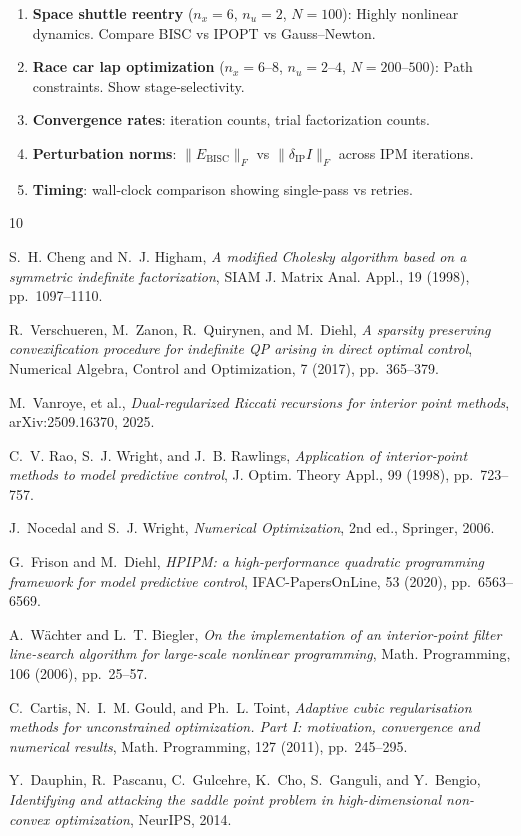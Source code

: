 \documentclass[11pt]{article}
\begin{document}
\begin{enumerate}
  \item \textbf{Space shuttle reentry} ($n_x=6$, $n_u=2$, $N=100$): Highly nonlinear
        dynamics. Compare BISC vs IPOPT vs Gauss--Newton.
  \item \textbf{Race car lap optimization} ($n_x=6\text{--}8$, $n_u=2\text{--}4$, $N=200\text{--}500$):
        Path constraints. Show stage-selectivity.
  \item \textbf{Convergence rates}: iteration counts, trial factorization counts.
  \item \textbf{Perturbation norms}: $\|E_{\mathrm{BISC}}\|_F$ vs
        $\|\delta_{\mathrm{IP}} I\|_F$ across IPM iterations.
  \item \textbf{Timing}: wall-clock comparison showing single-pass vs retries.
\end{enumerate}



\begin{thebibliography}{10}

S.~H. Cheng and N.~J. Higham,
\emph{A modified Cholesky algorithm based on a symmetric indefinite factorization},
SIAM J. Matrix Anal. Appl., 19 (1998), pp.~1097--1110.

R.~Verschueren, M.~Zanon, R.~Quirynen, and M.~Diehl,
\emph{A sparsity preserving convexification procedure for indefinite QP arising in direct optimal control},
Numerical Algebra, Control and Optimization, 7 (2017), pp.~365--379.

M.~Vanroye, et al.,
\emph{Dual-regularized Riccati recursions for interior point methods},
arXiv:2509.16370, 2025.

C.~V. Rao, S.~J. Wright, and J.~B. Rawlings,
\emph{Application of interior-point methods to model predictive control},
J. Optim. Theory Appl., 99 (1998), pp.~723--757.

J.~Nocedal and S.~J. Wright,
\emph{Numerical Optimization}, 2nd ed., Springer, 2006.

G.~Frison and M.~Diehl,
\emph{HPIPM: a high-performance quadratic programming framework for model predictive control},
IFAC-PapersOnLine, 53 (2020), pp.~6563--6569.

A.~W\"achter and L.~T. Biegler,
\emph{On the implementation of an interior-point filter line-search algorithm for large-scale nonlinear programming},
Math. Programming, 106 (2006), pp.~25--57.

C.~Cartis, N.~I.~M. Gould, and Ph.~L. Toint,
\emph{Adaptive cubic regularisation methods for unconstrained optimization. Part I: motivation, convergence and numerical results},
Math. Programming, 127 (2011), pp.~245--295.

Y.~Dauphin, R.~Pascanu, C.~Gulcehre, K.~Cho, S.~Ganguli, and Y.~Bengio,
\emph{Identifying and attacking the saddle point problem in high-dimensional non-convex optimization},
NeurIPS, 2014.

\end{thebibliography}
\end{document}
